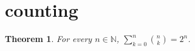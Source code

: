 \documentclass{article}
\newtheorem{theorem}{Theorem}
\begin{document}
\section{counting}

\begin{theorem}\label{thm:RC01}
For every $n\in\mathbb{N}$, $\sum_{k=0}^{n}\binom{n}{k}=2^n$.
\end{theorem}
\end{document}
